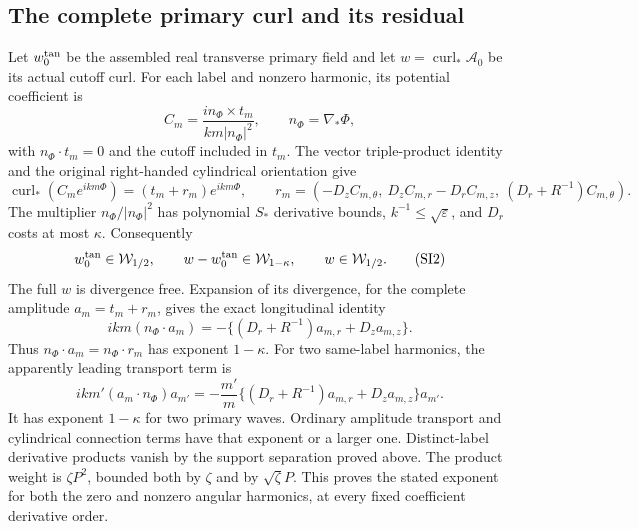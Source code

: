 \documentclass[10pt,a4paper]{article}
\begin{document}
\subsection{The complete primary curl and its residual}

Let $w_0^{\rm tan}$ be the assembled real transverse primary field and let
$w=\operatorname{curl}_*\mathcal A_0$ be its actual cutoff curl.  For each
label and nonzero harmonic, its potential coefficient is
\[
C_m=\frac{i n_\Phi\times t_m}{km|n_\Phi|^2},\qquad
n_\Phi=\nabla_*\Phi,
\]
with $n_\Phi\cdot t_m=0$ and the cutoff included in $t_m$.  The vector
triple-product identity and the original right-handed cylindrical orientation
give
\[
\operatorname{curl}_*(C_me^{ikm\Phi})=(t_m+r_m)e^{ikm\Phi},\qquad
r_m=(-D_zC_{m,\theta},\ D_zC_{m,r}-D_rC_{m,z},\
 (D_r+R^{-1})C_{m,\theta}).
\]
The multiplier $n_\Phi/|n_\Phi|^2$ has polynomial $S_*$ derivative bounds,
$k^{-1}\le\sqrt\varepsilon$, and $D_r$ costs at most $\kappa$.
Consequently
\[
w_0^{\rm tan}\in\mathcal W_{1/2},\qquad
w-w_0^{\rm tan}\in\mathcal W_{1-\kappa},\qquad
w\in\mathcal W_{1/2}.
\tag{SI2}
\]
The full $w$ is divergence free.  Expansion of its divergence, for the
complete amplitude $a_m=t_m+r_m$, gives the exact longitudinal identity
\[
ikm(n_\Phi\cdot a_m)
=-\{(D_r+R^{-1})a_{m,r}+D_za_{m,z}\}.
\tag{SI3}
\]
Thus $n_\Phi\cdot a_m=n_\Phi\cdot r_m$ has exponent $1-\kappa$.
For two same-label harmonics, the apparently leading transport term is
\[
ikm'(a_m\cdot n_\Phi)a_{m'}
=-\frac{m'}m\{(D_r+R^{-1})a_{m,r}+D_za_{m,z}\}a_{m'}.
\]
It has exponent $1-\kappa$ for two primary waves.  Ordinary amplitude
transport and cylindrical connection terms have that exponent or a larger
one.  Distinct-label derivative products vanish by the support separation
proved above.  The product weight is $\zeta P^2$, bounded both by $\zeta$
and by $\sqrt\zeta P$.  This proves the stated exponent for both the zero
and nonzero angular harmonics, at every fixed coefficient derivative order.
\end{document}
